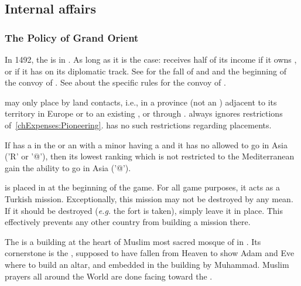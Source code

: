 \subsection{Internal affairs}
\subsubsection{The Policy of Grand Orient}
 In 1492, the  is in
. As long as it is the case:
\bparag \TUR receives half of its income if it owns , or if
it has  on its diplomatic track.
\bparag See  for the fall of  and
 and the beginning of the convoy of .
\bparag See  about the specific rules for the
convoy of .

 \TUR may only place \COL by land contacts,
i.e., in a province (not an \Area) adjacent to its territory in Europe
or to an existing \COL, or through .
\bparag \TUR always ignores restrictions
of~\ref{chExpenses:Pioneering}.
\bparag \TUR has no such restrictions regarding \TP placements.

\aparag If \TUR has a \TP in the \ROTW or an \dipAT with a minor
having a \TP and it has no \LeaderA allowed to go in Asia ('R' or '@'),
then its lowest ranking \LeaderA which is not restricted to the
Mediterranean gain the ability to go in Asia ('@').

\bparag {} is placed in  at the
beginning of the game.
\bparag For all game purposes, it acts as a Turkish mission.
\bparag Exceptionally, this mission may not be destroyed by any
mean. If it should be destroyed (\emph{e.g.} the fort is taken),
simply leave it in place. This effectively prevents any other country
from building a mission there.

\begin{histoire}
  The \constructionKaaba is a building at the heart of Muslim most
  sacred mosque of  in \villeMecca. Its
  cornerstone is the , supposed to have fallen from
  Heaven to show Adam and Eve where to build an altar, and embedded in
  the building by Muhammad. Muslim prayers all around the World are
  done facing toward the \constructionKaaba.
\end{histoire}

